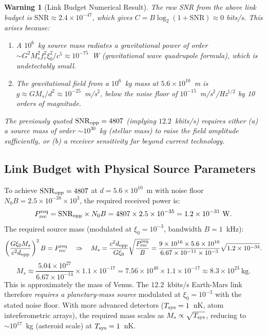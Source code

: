 \documentclass[aps,prd,twocolumn,superscriptaddress,nofootinbib]{revtex4-2}
\newcommand{\SNR}{\mathrm{SNR}}
\newtheorem{warning}{Warning}
\begin{document}
\begin{warning}[Link Budget Numerical Result]
\label{warn:link}
The raw SNR from the above link budget is $\SNR \approx 2.4\times10^{-47}$,
which gives $C = B\log_2(1+\SNR) \approx 0$ bits/s. This arises because:
\begin{enumerate}
\item A $10^6$~kg source mass radiates a gravitational power of order
  $\sim G^2 M_s^2 f_c^2 \xi_0^2 / c^5 \approx 10^{-75}$~W
  (gravitational wave quadrupole formula), which is undetectably small.
\item The gravitational field from a $10^6$~kg mass at $5.6\times10^{10}$~m
  is $g \approx GM_s/d^2 \approx 10^{-25}$~m/s$^2$, below the noise
  floor of $10^{-15}$~m/s$^2$/Hz$^{1/2}$ by 10 orders of magnitude.
\end{enumerate}
The previously quoted $\SNR_{\rm opp} = 4807$ (implying $12.2$~kbits/s)
requires either (a) a source mass of order $\sim 10^{30}$~kg
(stellar mass) to raise the field amplitude sufficiently, or (b) a
receiver sensitivity far beyond current technology.
\end{warning}

\subsection{Link Budget with Physical Source Parameters}

To achieve $\SNR_{\rm opp} = 4807$ at $d = 5.6\times10^{10}$~m with
noise floor $N_0 B = 2.5\times10^{-38} \times 10^3$, the required
received power is:
\begin{equation}
P_{\rm rec}^{\rm req} = \SNR_{\rm opp} \times N_0 B
= 4807 \times 2.5\times10^{-35} = 1.2\times10^{-31}~\text{W}.
\label{eq:P-rec-req}
\end{equation}
The required source mass (modulated at $\xi_0 = 10^{-3}$, bandwidth $B = 1$~kHz):
\begin{equation}
\left(\frac{G \xi_0 M_s}{c^2 d_{\rm opp}}\right)^2 B = P_{\rm rec}^{\rm req}
\quad\Rightarrow\quad
M_s = \frac{c^2 d_{\rm opp}}{G \xi_0} \sqrt{\frac{P_{\rm rec}^{\rm req}}{B}}
= \frac{9\times10^{16} \times 5.6\times10^{10}}{6.67\times10^{-11} \times 10^{-3}}
  \sqrt{1.2\times10^{-34}}.
\end{equation}
\begin{equation}
M_s \approx \frac{5.04\times10^{27}}{6.67\times10^{-14}}
  \times 1.1\times10^{-17}
= 7.56\times10^{40} \times 1.1\times10^{-17}
\approx 8.3\times10^{23}~\text{kg}.
\label{eq:M-req}
\end{equation}
This is approximately the mass of Venus. The $12.2$~kbits/s
Earth-Mars link therefore \emph{requires a planetary-mass source} modulated
at $\xi_0 = 10^{-3}$ with the stated noise floor. With more advanced
detectors ($T_{\rm sys} = 1$~nK, atom interferometric arrays),
the required mass scales as $M_s \propto \sqrt{T_{\rm sys}}$, reducing to
$\sim 10^{17}$~kg (asteroid scale) at $T_{\rm sys} = 1$~nK.
\end{document}
